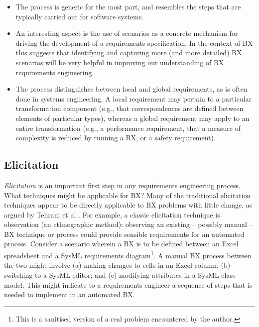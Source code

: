 \begin{itemize}
\item The process is generic for the most part, and resembles the steps that are typically carried out for software systems.

\item An interesting aspect is the use of scenarios as a concrete mechanism for driving the development of a requirements specification. In the context of BX this suggests that identifying and capturing more (and more detailed) BX scenarios will be very helpful in improving our understanding of BX requirements engineering.

\item The process distinguishes between local and global requirements, as is often done in systems engineering. A local requirement may pertain to a particular transformation component (e.g., that correspondences are defined between elements of particular types), whereas a global requirement may apply to an entire transformation (e.g., a performance requirement, that a measure of complexity is reduced by running a BX, or a safety requirement).
\end{itemize}

\subsection{Elicitation}
\textit{Elicitation} is an important first step in any requirements engineering process. What techniques might be applicable for BX? Many of the traditional elicitation techniques appear to be directly applicable to BX problems with little change, as argued by Tehrani et al \cite{TehraniZL16}. For example, a classic elicitation technique is observation (an ethnographic method): observing an existing -- possibly manual -- BX technique or process could provide sensible requirements for an automated process. Consider a scenario wherein a BX is to be defined between an Excel spreadsheet and a SysML requirements diagram\footnote{This is a sanitised version of a real problem encountered by the author.}. A manual BX process between the two might involve (a) making changes to cells in an Excel column; (b) switching to a SysML editor; and (c) modifying attributes in a SysML class model. This might indicate to a requirements engineer a sequence of steps that is needed to implement in an automated BX.

